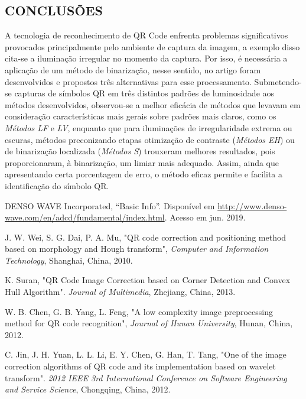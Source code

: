\documentclass{ceel}
\begin{document}
\begin{multicols}{2}
\section{CONCLUSÕES}
A tecnologia de reconhecimento de QR Code enfrenta problemas significativos provocados principalmente pelo ambiente de captura da imagem, a exemplo disso cita-se a iluminação irregular no momento da captura. Por isso, é necessária a aplicação de um método de binarização, nesse sentido, no artigo foram desenvolvidos e propostos três alternativas para esse processamento. Submetendo-se capturas de símbolos QR em três distintos padrões de luminosidade aos métodos desenvolvidos, observou-se a melhor eficácia de métodos que levavam em consideração características mais gerais sobre padrões mais claros, como os \emph{Métodos LF} e \textit{LV}, enquanto que para iluminações de irregularidade extrema ou escuras, métodos preconizando etapas otimização de contraste (\emph{Métodos EH}) ou de binarização localizada (\emph{Métodos S}) trouxeram melhores resultados, pois proporcionaram, à binarização, um limiar mais adequado. Assim, ainda que apresentando certa porcentagem de erro, o método eficaz permite e facilita a identificação do símbolo QR.

\begin{thebibliography}{9} %

    DENSO WAVE Incorporated,
    “Basic Info”. 
    Disponível em \url{http://www.denso-wave.com/en/adcd/fundamental/index.html}. Acesso em jun. 2019.

J. W. Wei, S. G. Dai, P. A. Mu, 
"QR code correction and positioning method based on morphology and Hough transform", 
\emph{Computer and Information
Technology}, Shanghai, China, 2010.

K. Suran, 
"QR Code Image Correction based on Corner Detection and Convex Hull Algorithm". 
\emph{Journal of Multimedia}, Zhejiang, China, 2013.

 W. B. Chen, G. B. Yang, L. Feng, 
"A low complexity image preprocessing method for QR code recognition", 
\emph{Journal of Hunan University}, Hunan, China, 2012.

C. Jin, J. H. Yuan, L. L. Li, E. Y. Chen, G. Han, T. Tang, 
"One of the image correction algorithms of QR code and its implementation
based on wavelet transform".
\emph{2012 IEEE 3rd International Conference on
Software Engineering and Service Science}, Chongqing, China, 2012.


\end{thebibliography}
\end{multicols}
\end{document}
